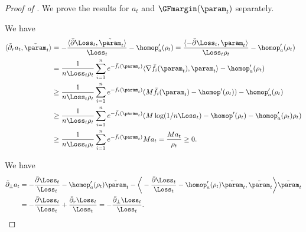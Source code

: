 \begin{proof}[Proof of ]
We prove the results for $a_t$ and $\GFmargin(\param_t)$ separately.

We have 
\begin{align*}
\langle \tilde \partial_r a_t, \tilde \param_t \rangle 
&= - \frac{ \langle\bar \partial \Loss_t, \tilde \param_t  \rangle }{\Loss_t} - {\homop_a^\prime (\rho_t)} 
= \frac{ \langle - \bar \partial \Loss_t,  \param_t  \rangle }{\Loss_t \rho_t} - {\homop_a^\prime (\rho_t)} 
\\ 
&= \frac{1}{ n \Loss_t \rho_t}\sum_{i=1}^n e^{-\bar f_i(\param_t )} \langle \nabla \bar f_i (\param_t ), \param_t \rangle - {\homop_a^\prime (\rho_t)}
\\ 
&\ge  \frac{1}{ n \Loss_t \rho_t}\sum_{i=1}^n e^{-\bar f_i(\param_t )} (M \bar f_i(\param_t) - \homop^\prime (\rho_t))  -{\homop_a^\prime (\rho_t)}
\\ 
&\ge \frac{1}{ n \Loss_t \rho_t}\sum_{i=1}^n e^{-\bar f_i(\param_t )} (M \log (1/ n \Loss_t) - \homop^\prime (\rho_t) - \homop_a^\prime (\rho_t) \rho_t)   
\\ 
&\ge \frac{1}{ n \Loss_t \rho_t}\sum_{i=1}^n e^{-\bar f_i(\param_t )} M a_t   
= \frac{M a_t}{ \rho_t}
\ge 0.
\end{align*}

We have 
\begin{align*}
\tilde \partial_\perp a_t
&=  
- \frac{ \bar \partial \Loss_t}{\Loss_t} -{\homop_a^\prime (\rho_t) \tilde \param_t} - 
\bigg \langle - \frac{ \bar \partial \Loss_t}{\Loss_t } -{\homop_a^\prime (\rho_t) \tilde \param_t}, \tilde \param_t \bigg\rangle \tilde \param_t \\ 
& = - \frac{ \bar \partial \Loss_t}{\Loss_t} + \frac{ \bar \partial_r \Loss_t}{\Loss_t } = - \frac{ \bar \partial_\perp \Loss_t}{\Loss_t}.
\end{align*}



\end{proof}
